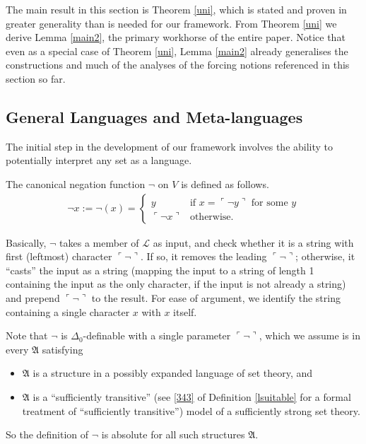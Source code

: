 \documentclass[12pt]{article}
\numberwithin{equation}{section}
\begin{document}
The main result in this section is Theorem \ref{uni}, which is stated and proven in greater generality than is needed for our framework. From Theorem \ref{uni} we derive Lemma \ref{main2}, the primary workhorse of the entire paper. Notice that even as a special case of Theorem \ref{uni}, Lemma \ref{main2} already generalises the constructions and much of the analyses of the forcing notions referenced in this section so far.

\subsection{General Languages and Meta-languages}

The initial step in the development of our framework involves the ability to potentially interpret any set as a language. 

\begin{defi}\label{neg}
The canonical negation function $\neg$ on $V$ is defined as follows. 
\begin{align*}
    \neg x := \neg(x) = 
    \begin{cases}
        y & \text{if } x = \ulcorner \neg y \urcorner \text{ for some } y \\
        \ulcorner \neg x \urcorner & \text{otherwise}.
    \end{cases}
\end{align*}
\end{defi}

Basically, $\neg$ takes a member of $\mathcal{L}$ as input, and check whether it is a string with first (leftmost) character $\ulcorner \neg \urcorner$. If so, it removes the leading $\ulcorner \neg \urcorner$; otherwise, it ``casts'' the input as a string (mapping the input to a string of length 1 containing the input as the only character, if the input is not already a string) and prepend $\ulcorner \neg \urcorner$ to the result. For ease of argument, we identify the string containing a single character $x$ with $x$ itself. 

\begin{rem}\label{rem32}
Note that $\neg$ is $\Delta_0$-definable with a single parameter $\ulcorner \neg \urcorner$, which we assume is in every $\mathfrak{A}$ satisfying
\begin{itemize}
    \item $\mathfrak{A}$ is a structure in a possibly expanded language of set theory, and
    \item $\mathfrak{A}$ is a ``sufficiently transitive'' (see \ref{343} of Definition \ref{lsuitable} for a formal treatment of ``sufficiently transitive'') model of a sufficiently strong set theory.
\end{itemize} 
So the definition of $\neg$ is absolute for all such structures $\mathfrak{A}$.
\end{rem}
\end{document}
